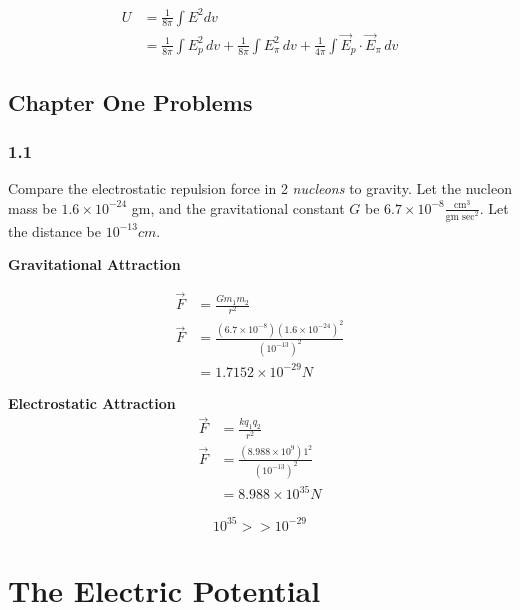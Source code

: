 \documentclass[svgnames]{article}
\begin{document}
 \begin{align*} 
 U &= \frac{1}{8\pi} \int E^2 dv \\
 &= \frac{1}{8\pi} \int E_p^2 \, dv + \frac{1}{8\pi} \int E_\pi^2 \, dv + \frac{1}{4\pi} \int \vec{E}_p \cdot \vec{E}_\pi \, dv
 \end{align*}
 
 \vspace{20px}
 \subsection{Chapter One Problems} 
 
 \subsubsection{1.1} 
 
 Compare the electrostatic repulsion force in 2 \textit{nucleons} to gravity. Let the nucleon mass be $1.6 \times 10^{-24}$ gm, and the gravitational constant $G$ be $ 6.7 \times 10^{-8} \frac{\text{cm}^3}{\text{gm sec}^2}$. Let the distance be $10^{-13} cm$. 
 
 \vspace{20px} 
 
 \textbf{Gravitational Attraction} 
 
 \begin{align*} 
 \vec{F} &= \frac{Gm_1m_2}{r^2} \\
 \vec{F} &= \frac{(6.7 \times 10^{-8}) (1.6 \times 10^{-24})^2}{(10^{-13})^2} \\
 & = 1.7152 \times 10^{-29} N 
 \end{align*}
 
 \vspace{10px} 
 
 \textbf{Electrostatic Attraction} 
 \begin{align*} 
 \vec{F} &= \frac{kq_1q_2}{r^2} \\
 \vec{F} &= \frac{(8.988 \times 10^{9})1^2}{(10^{-13})^2} \\
 & = 8.988 \times 10^{35} N
 \end{align*}
 
\vspace{10px} 

\[ 10^{35} >> 10^{-29} \]

\newpage

\section{The Electric Potential} 
\end{document}
